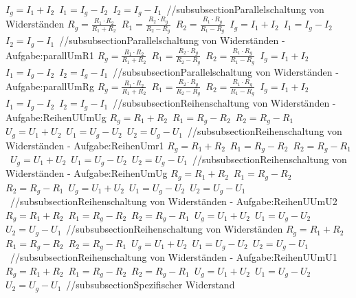 $ I_{g}  = I_{1}  + I_{2} $\ 
$ I_{1}  = I_{g}  - I_{2} $\ 
$ I_{2}  = I_{g}  - I_{1} $\ 
//subsubsection{Parallelschaltung von Widerständen} 
$ R_{g}  = \frac{R_{1} \cdot R_{2} }{R_{1} +R_{2} } $\ 
$ R_{1}  = \frac{R_{2} \cdot R_{g} }{R_{2} -R_{g} } $\ 
$ R_{2}  = \frac{R_{1} \cdot R_{g} }{R_{1} -R_{g} } $\ 
$ I_{g}  = I_{1}  + I_{2} $\ 
$ I_{1}  = I_{g}  - I_{2} $\ 
$ I_{2}  = I_{g}  - I_{1} $\ 
//subsubsection{Parallelschaltung von Widerständen - Aufgabe:parallUmR1} 
$ R_{g}  = \frac{R_{1} \cdot R_{2} }{R_{1} +R_{2} } $\ 
$ R_{1}  = \frac{R_{2} \cdot R_{g} }{R_{2} -R_{g} } $\ 
$ R_{2}  = \frac{R_{1} \cdot R_{g} }{R_{1} -R_{g} } $\ 
$ I_{g}  = I_{1}  + I_{2} $\ 
$ I_{1}  = I_{g}  - I_{2} $\ 
$ I_{2}  = I_{g}  - I_{1} $\ 
//subsubsection{Parallelschaltung von Widerständen - Aufgabe:parallUmRg} 
$ R_{g}  = \frac{R_{1} \cdot R_{2} }{R_{1} +R_{2} } $\ 
$ R_{1}  = \frac{R_{2} \cdot R_{g} }{R_{2} -R_{g} } $\ 
$ R_{2}  = \frac{R_{1} \cdot R_{g} }{R_{1} -R_{g} } $\ 
$ I_{g}  = I_{1}  + I_{2} $\ 
$ I_{1}  = I_{g}  - I_{2} $\ 
$ I_{2}  = I_{g}  - I_{1} $\ 
//subsubsection{Reihenschaltung von Widerständen - Aufgabe:ReihenUUmUg} 
$ R_{g}  = R_{1}  + R_{2} $\ 
$ R_{1}  = R_{g}  - R_{2} $\ 
$ R_{2}  = R_{g}  - R_{1} $\ 
$ U_{g}  = U_{1}  + U_{2} $\ 
$ U_{1}  = U_{g}  - U_{2} $\ 
$ U_{2}  = U_{g}  - U_{1} $\ 
//subsubsection{Reihenschaltung von Widerständen - Aufgabe:ReihenUmr1} 
$ R_{g}  = R_{1}  + R_{2} $\ 
$ R_{1}  = R_{g}  - R_{2} $\ 
$ R_{2}  = R_{g}  - R_{1} $\ 
$ U_{g}  = U_{1}  + U_{2} $\ 
$ U_{1}  = U_{g}  - U_{2} $\ 
$ U_{2}  = U_{g}  - U_{1} $\ 
//subsubsection{Reihenschaltung von Widerständen - Aufgabe:ReihenUmUg} 
$ R_{g}  = R_{1}  + R_{2} $\ 
$ R_{1}  = R_{g}  - R_{2} $\ 
$ R_{2}  = R_{g}  - R_{1} $\ 
$ U_{g}  = U_{1}  + U_{2} $\ 
$ U_{1}  = U_{g}  - U_{2} $\ 
$ U_{2}  = U_{g}  - U_{1} $\ 
//subsubsection{Reihenschaltung von Widerständen - Aufgabe:ReihenUUmU2} 
$ R_{g}  = R_{1}  + R_{2} $\ 
$ R_{1}  = R_{g}  - R_{2} $\ 
$ R_{2}  = R_{g}  - R_{1} $\ 
$ U_{g}  = U_{1}  + U_{2} $\ 
$ U_{1}  = U_{g}  - U_{2} $\ 
$ U_{2}  = U_{g}  - U_{1} $\ 
//subsubsection{Reihenschaltung von Widerständen} 
$ R_{g}  = R_{1}  + R_{2} $\ 
$ R_{1}  = R_{g}  - R_{2} $\ 
$ R_{2}  = R_{g}  - R_{1} $\ 
$ U_{g}  = U_{1}  + U_{2} $\ 
$ U_{1}  = U_{g}  - U_{2} $\ 
$ U_{2}  = U_{g}  - U_{1} $\ 
//subsubsection{Reihenschaltung von Widerständen - Aufgabe:ReihenUUmU1} 
$ R_{g}  = R_{1}  + R_{2} $\ 
$ R_{1}  = R_{g}  - R_{2} $\ 
$ R_{2}  = R_{g}  - R_{1} $\ 
$ U_{g}  = U_{1}  + U_{2} $\ 
$ U_{1}  = U_{g}  - U_{2} $\ 
$ U_{2}  = U_{g}  - U_{1} $\ 
//subsubsection{Spezifischer Widerstand} 
